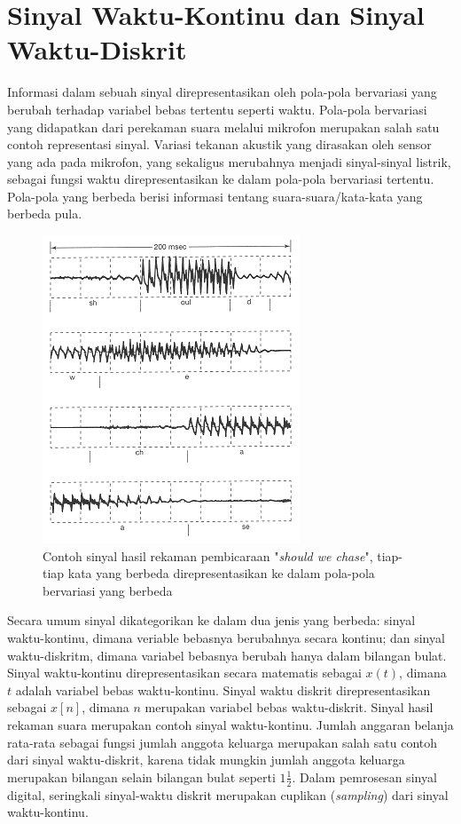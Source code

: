 \section{Sinyal Waktu-Kontinu dan Sinyal Waktu-Diskrit}
Informasi dalam sebuah sinyal direpresentasikan oleh pola-pola bervariasi yang berubah terhadap variabel bebas tertentu seperti waktu. Pola-pola bervariasi yang didapatkan dari perekaman suara melalui mikrofon merupakan salah satu contoh representasi sinyal. Variasi tekanan akustik yang dirasakan oleh sensor yang ada pada mikrofon, yang sekaligus merubahnya menjadi sinyal-sinyal listrik, sebagai fungsi waktu direpresentasikan ke dalam pola-pola bervariasi tertentu. Pola-pola yang berbeda berisi informasi tentang suara-suara/kata-kata yang berbeda pula.  

\begin{figure}[!h]
\centering
\includegraphics[scale=1]{pict/speech}
\caption{Contoh sinyal hasil rekaman pembicaraan "\textit{should we chase}", tiap-tiap kata yang berbeda direpresentasikan ke dalam pola-pola bervariasi yang berbeda}\label{speech}
\end{figure} 

Secara umum sinyal dikategorikan ke dalam dua jenis yang berbeda: sinyal waktu-kontinu, dimana veriable bebasnya berubahnya secara kontinu; dan sinyal waktu-diskritm, dimana variabel bebasnya berubah hanya dalam bilangan bulat. Sinyal waktu-kontinu direpresentasikan secara matematis sebagai $x(t)$, dimana $t$ adalah variabel bebas waktu-kontinu. Sinyal waktu diskrit direpresentasikan sebagai $x[n]$, dimana $n$ merupakan variabel bebas waktu-diskrit. Sinyal hasil rekaman suara merupakan contoh sinyal waktu-kontinu. Jumlah anggaran belanja rata-rata sebagai fungsi jumlah anggota keluarga merupakan salah satu contoh dari sinyal waktu-diskrit, karena tidak mungkin jumlah anggota keluarga merupakan bilangan selain bilangan bulat seperti $1\frac{1}{2}$. Dalam pemrosesan sinyal digital, seringkali sinyal-waktu diskrit merupakan cuplikan (\textit{sampling}) dari sinyal waktu-kontinu.

